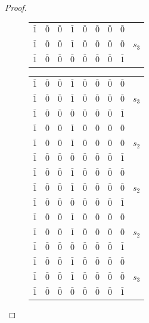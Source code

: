 \documentclass[12pt,a4paper]{scrartcl}
\theoremstyle{plain}
\theoremstyle{definition}
\newcommand{\2}{\mathbb{Z} / 2 \mathbb{Z}}
\newcommand{\1}{\bar{1}}
\newcommand{\0}{\bar{0}}
\begin{document}
\begin{proof}
\begin{figure}[]
\begin{minipage}[c]{0.5\textwidth}
\begin{tabular}{|c|c|c|c|c|c|c|c||c|}
			$\1$  & $\0$ & $\0$\cellcolor[gray]{0.7} & $\1$ & $\0$ & $\0$ & $\0$ & $\0$ &  \\
			$\1$  & $\0$ & $\0$ \cellcolor[gray]{0.7}& $\1$ & $\0$ & $\0$ & $\0$ & $\0$ & $s_3$ \\
			$\1$  & $\0$ & $\0$ \cellcolor[gray]{0.7}& $\0$ & $\0$ & $\0$ & $\0$ & $\1$ & \\ \hline
		\end{tabular}
		\end{minipage}%
		\hfill%
		\begin{minipage}[c]{0.5\textwidth} 
		\vspace{0pt}
		\begin{tabular}{|c|c|c|c|c|c|c|c||c|}\hline

			
			$\1$  & $\0$ & $\0$ & $\1$\cellcolor[gray]{0.7} & $\0$ & $\0$ & $\0$ & $\0$ &  \\
			$\1$  & $\0$ & $\0$ \cellcolor[gray]{0.7}& $\1$ & $\0$ & $\0$ & $\0$ & $\0$ & $s_3$ \\
			$\1$  & $\0$ & $\0$ & $\0$\cellcolor[gray]{0.7} & $\0$ & $\0$ & $\0$ & $\1$ & \\ \hline
			
			$\1$  & $\0$ & $\0$ \cellcolor[gray]{0.7}& $\1$ & $\0$ & $\0$ & $\0$ & $\0$ &  \\
			$\1$  & $\0$ \cellcolor[gray]{0.7}& $\0$ & $\1$ & $\0$ & $\0$ & $\0$ & $\0$ & $s_2$ \\
			$\1$  & $\0$ & $\0$ & $\0$ & $\0$\cellcolor[gray]{0.7} & $\0$ & $\0$ & $\1$ & \\ \hline
			
			$\1$  & $\0$\cellcolor[gray]{0.7} & $\0$ & $\1$ & $\0$ & $\0$ & $\0$ & $\0$ &  \\
			$\1$  & $\0$ \cellcolor[gray]{0.7}& $\0$ & $\1$ & $\0$ & $\0$ & $\0$ & $\0$ & $s_2$ \\
			$\1$  & $\0$ & $\0$ & $\0$ & $\0$\cellcolor[gray]{0.7} & $\0$ & $\0$ & $\1$ & \\ \hline
			
			$\1$  \cellcolor[gray]{0.7}& $\0$ & $\0$ & $\1$ & $\0$ & $\0$ & $\0$ & $\0$ &  \\
			$\1$  & $\0$ \cellcolor[gray]{0.7}& $\0$ & $\1$ & $\0$ & $\0$ & $\0$ & $\0$ & $s_2$ \\
			$\1$  & $\0$ & $\0$ & $\0$ & $\0$\cellcolor[gray]{0.7} & $\0$ & $\0$ & $\1$ & \\ \hline
			
			$\1$  & $\0$\cellcolor[gray]{0.7} & $\0$ & $\1$ & $\0$ & $\0$ & $\0$ & $\0$ &  \\
			$\1$  & $\0$ \cellcolor[gray]{0.7}& $\0$ & $\1$ & $\0$ & $\0$ & $\0$ & $\0$ & $s_3$ \\
			$\1$  & $\0$ & $\0$ & $\0$ & $\0$\cellcolor[gray]{0.7} & $\0$ & $\0$ & $\1$ & \\ \hline
			

\end{tabular}
\end{minipage}
\end{figure}
\end{proof}
\end{document}
